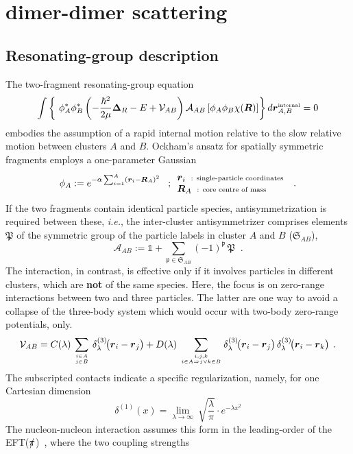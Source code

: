 \documentclass[onecolumn,preprint,superscriptaddress,nofootinbib,notitlepage,10pt,linenumbers]{revtex4-1}
\newcommand{\eftnopi}{\mbox{EFT($\slashed{\pi}$) }}
\newcommand{\la}{\label}
\newcommand{\be}{\begin{equation}}
\newcommand{\ee}{\end{equation}}
\newcommand{\ie}{\textit{i.e.}\;}
\newcommand{\ve}[1]{\ensuremath{\boldsymbol{#1}}}
\newcommand{\ddrei}[1]{\delta_{\tiny \lambda}^{(3)}\!\big(#1\big)}
\newcommand{\cc}{\ensuremath C(\lambda)}
\newcommand{\dd}{\ensuremath D(\lambda)}
\begin{document}
\section{dimer-dimer scattering}

\subsection{Resonating-group description}

The two-fragment resonating-group equation
\be\label{eq.rgm.eqom}
\int\left\lbrace~\phi^*_A\phi^*_B\left(-\frac{\hbar^2}{2\mu}\ve{\Delta}_R-E+\mathcal{V}_{AB}\right)
\mathcal{A}_{AB}\left[\phi_A\phi_B\chi(\ve{R})\right]\right\rbrace d\ve{r}^\text{\tiny internal}_{A,B}=0
\ee
embodies the assumption of a rapid internal motion relative to the slow relative motion between
clusters $A$ and $B$.
Ockham's ansatz for spatially symmetric fragments employs a one-parameter Gaussian
\be\label{eq.rgm.corewfkt}
\phi_A:=e^{-\alpha\sum_{i=1}^A\left(\ve{r}_i-\ve{R}_A\right)^2}\;\;\;;
\begin{array}{l}
     \ve{r}_i\;\;\text{\scriptsize : single-particle coordinates}  \\
     \ve{R}_A\;\;\text{\scriptsize : core centre of mass}
\end{array}\;\;.
\ee
If the two fragments contain identical particle species, antisymmetrization is required between these, \ie,
the inter-cluster antisymmetrizer comprises elements $\mathfrak{P}$ of the symmetric group of the particle labels
in cluster $A$ and $B$ ($\mathfrak{S}_{AB}$),   
\be\la{eq.asymmetr}
\mathcal{A}_{AB}:=\mathbb{1}+\sum_{\mathfrak{p}\in \mathfrak{S}_{AB}}(-1)^{\mathfrak{p}}\,\mathfrak{P}\;\;.
\ee 
The interaction, in contrast, is effective only if it involves particles in different clusters, which are {\bf not} of
the same species. Here, the focus is on zero-range interactions between two and three particles. The latter are one
way to avoid a collapse of the three-body system which would occur with two-body zero-range potentials, only.
\be\la{eq.int}
\mathcal{V}_{AB}=\cc\,\sum_{i\in A\atop j\in B}\,\ddrei{\ve{r}_i-\ve{r}_j}+
\dd\,\sum_{i,j,k\atop i\in A\Rightarrow j\vee k\in B}\ddrei{\ve{r}_i-\ve{r}_j}\,\ddrei{\ve{r}_i-\ve{r}_k}\;\,.
\ee
The subscripted contacts indicate a specific regularization, namely, for one Cartesian dimension
\be\la{eq.delta}
\delta^{(1)}(x)=\lim_{\lambda\to\infty}~\sqrt{\frac{\lambda}{\pi}}\cdot e^{-\lambda x^2}
\ee
The nucleon-nucleon interaction assumes this form in the leading-order of the \eftnopi, where the two coupling strengths
\end{document}
